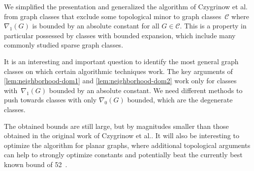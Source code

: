 We simplified the presentation and generalized the algorithm of Czygrinow et al.~\cite{czygrinow2018distributed} from graph classes that exclude
some topological minor to graph classes~$\mathcal{C}$ where
$\nabla_1(G)$ is bounded
by an absolute constant for all $G\in \mathcal{C}$. This is a property
in particular possessed by classes with bounded expansion, which include
many commonly studied sparse graph classes.

It is an interesting and important question to identify the most
general graph classes on which certain algorithmic techniques work.
The key arguments of \cref{lem:neighborhood-dom1} and \cref{lem:neighborhood-dom2} work only for classes with~$\nabla_1(G)$ bounded by an absolute constant. We need different methods
to push towards classes with only $\nabla_0(G)$ bounded,
which are the degenerate classes.

The obtained bounds are still large,
but by magnitudes smaller than those obtained in the original work of
Czygrinow et al.\cite{czygrinow2018distributed}. It will also be
interesting to optimize the algorithm for planar graphs, where additional
topological arguments can help to strongly optimize constants and
potentially beat the currently best known bound of 52~\cite{lenzen2013distributed,wawrzyniak2014strengthened}.















































